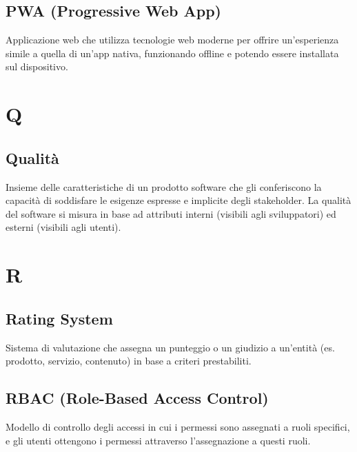 \documentclass[a4paper,11pt]{article}
\begin{document}
\subsection{PWA (Progressive Web App)}
Applicazione web che utilizza tecnologie web moderne per offrire un'esperienza simile a quella di un'app nativa, funzionando offline e potendo essere installata sul dispositivo.

\newpage









\section{Q}

\subsection{Qualità}
Insieme delle caratteristiche di un prodotto software che gli conferiscono la capacità di soddisfare le esigenze espresse e implicite degli stakeholder. La qualità del software si misura in base ad attributi interni (visibili agli sviluppatori) ed esterni (visibili agli utenti).

\newpage









\section{R}

\subsection{Rating System}
Sistema di valutazione che assegna un punteggio o un giudizio a un'entità (es. prodotto, servizio, contenuto) in base a criteri prestabiliti.









\subsection{RBAC (Role-Based Access Control)}
Modello di controllo degli accessi in cui i permessi sono assegnati a ruoli specifici, e gli utenti ottengono i permessi attraverso l'assegnazione a questi ruoli.
\end{document}
